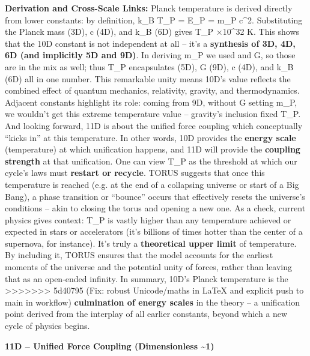 \documentclass[]{article}
\begin{document}
\textbf{Derivation and Cross-Scale Links:} Planck temperature is derived
directly from lower constants: by definition, k\_B T\_P = E\_P = m\_P
c\^{}2​. Substituting the Planck mass (3D), c (4D), and k\_B (6D) gives
T\_P ×10\^{}32 K​. This shows that the 10D constant is not
independent at all -- it's a \textbf{synthesis of 3D, 4D, 6D (and
implicitly 5D and 9D)}​. In deriving m\_P we used \hbar and G, so those are
in the mix as well; thus T\_P encapsulates \hbar (5D), G (9D), c (4D), and
k\_B (6D) all in one number​. This remarkable unity means 10D's value
reflects the combined effect of quantum mechanics, relativity, gravity,
and thermodynamics. Adjacent constants highlight its role: coming from
9D, without G setting m\_P, we wouldn't get this extreme temperature
value -- gravity's inclusion fixed T\_P. And looking forward, 11D is
about the unified force coupling which conceptually ``kicks in'' at this
temperature. In other words, 10D provides the \textbf{energy scale}
(temperature) at which unification happens, and 11D will provide the
\textbf{coupling strength} at that unification​. One can view T\_P as
the threshold at which our cycle's laws must \textbf{restart or
recycle}. TORUS suggests that once this temperature is reached (e.g. at
the end of a collapsing universe or start of a Big Bang), a phase
transition or ``bounce'' occurs that effectively resets the universe's
conditions -- akin to closing the torus and opening a new one​. As a
check, current physics gives context: T\_P is vastly higher than any
temperature achieved or expected in stars or accelerators (it's billions
of times hotter than the center of a supernova, for instance). It's
truly a \textbf{theoretical upper limit} of temperature. By including
it, TORUS ensures that the model accounts for the earliest moments of
the universe and the potential unity of forces, rather than leaving that
as an open-ended infinity. In summary, 10D's Planck temperature is the
>>>>>>> 5d40795 (Fix: robust Unicode/maths in LaTeX and explicit push to main in workflow)
\textbf{culmination of energy scales} in the theory -- a unification
point derived from the interplay of all earlier constants, beyond which
a new cycle of physics begins.

\textbf{11D -- Unified Force Coupling (Dimensionless
\textasciitilde{}1)}
\end{document}
